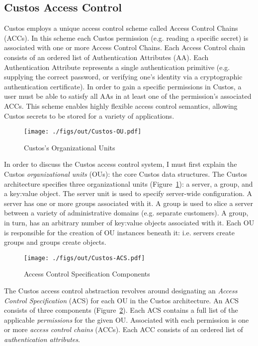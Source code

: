 \subsection{Custos Access Control}
\label{chap:custos:arch:ac}

Custos employs a unique access control scheme called Access Control
Chains (ACCs). In this scheme each Custos permission (e.g. reading a
specific secret) is associated with one or more Access Control
Chains. Each Access Control chain consists of an ordered list of
Authentication Attributes (AA). Each Authentication Attribute
represents a single authentication primitive (e.g. supplying the
correct password, or verifying one's identity via a cryptographic
authentication certificate). In order to gain a specific permissions
in Custos, a user must be able to satisfy all AAs in at least one of
the permission's associated ACCs. This scheme enables highly flexible
access control semantics, allowing Custos secrets to be stored for a
variety of applications.

\begin{figure}[t]
  \centering
  \texttt{[image: ./figs/out/Custos-OU.pdf]}
  \caption{Custos's Organizational Units}
  \label{fig:custos-ou}
\end{figure}

In order to discuss the Custos access control system, I must first
explain the Custos \emph{organizational units} (OUs): the core Custos
data structures. The Custos architecture specifies three
organizational units (Figure~\ref{fig:custos-ou}): a server, a group,
and a key:value object. The server unit is used to specify server-wide
configuration. A server has one or more groups associated with it. A
group is used to slice a server between a variety of administrative
domains (e.g. separate customers). A group, in turn, has an arbitrary
number of key:value objects associated with it. Each OU is responsible
for the creation of OU instances beneath it: i.e. servers create
groups and groups create objects.

\begin{figure}[t]
  \centering
  \texttt{[image: ./figs/out/Custos-ACS.pdf]}
  \caption{Access Control Specification Components}
  \label{fig:custos-acs}
\end{figure}

The Custos access control abstraction revolves around designating an
\emph{Access Control Specification} (ACS) for each OU in the Custos
architecture. An ACS consists of three components
(Figure~\ref{fig:custos-acs}). Each ACS contains a full list of the
applicable \emph{permissions} for the given OU. Associated with each
permission is one or more \emph{access control chains} (ACCs). Each
ACC consists of an ordered list of \emph{authentication attributes}.

